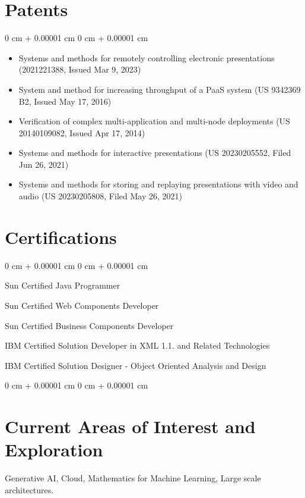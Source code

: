 \documentclass[10pt, letterpaper]{article}
\newenvironment{highlights}{
    \begin{itemize}[
        topsep=0.10 cm,
        parsep=0.10 cm,
        partopsep=0pt,
        itemsep=0pt,
        leftmargin=0 cm + 10pt
    ]
}{
    \end{itemize}
} %
\newenvironment{onecolentry}{
    \begin{adjustwidth}{
        0 cm + 0.00001 cm
    }{
        0 cm + 0.00001 cm
    }
}{
    \end{adjustwidth}
} %
\begin{document}
        \section{Patents}
        \vspace{0.10 cm}
        \begin{onecolentry}
            \begin{highlights}
                \item Systems and methods for remotely controlling electronic presentations (2021221388, Issued Mar 9, 2023)
                \item System and method for increasing throughput of a PaaS system (US 9342369 B2, Issued May 17, 2016)
                \item Verification of complex multi-application and multi-node deployments (US 20140109082, Issued Apr 17, 2014)
                \item Systems and methods for interactive presentations (US 20230205552, Filed Jun 26, 2021)
                \item Systems and methods for storing and replaying presentations with video and audio (US 20230205808, Filed May 26, 2021)
            \end{highlights}
        \end{onecolentry}

        \section{Certifications}
        \vspace{0.10 cm}
        \begin{onecolentry}
            \item Sun Certified Java Programmer
            \item Sun Certified Web Components Developer
            \item Sun Certified Business Components Developer
            \item IBM Certified Solution Developer in XML 1.1. and Related Technologies
            \item IBM Certified Solution Designer - Object Oriented Analysis and Design
        \end{onecolentry}

        

        \begin{onecolentry}
        \section{Current Areas of Interest and Exploration}
        \vspace{0.10 cm}
        Generative AI, Cloud, Mathematics for Machine Learning, Large scale architectures.
        \end{onecolentry}
\end{document}
